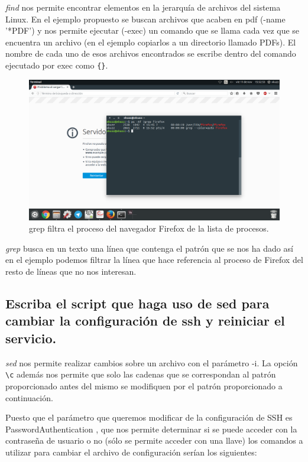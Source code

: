 \begin{flushleft}
\textit{find} nos permite encontrar elementos en la jerarquía de archivos del sistema Linux. En el ejemplo propuesto se buscan archivos que acaben en pdf (-name '*PDF') y nos permite ejecutar (-exec) un comando que se llama cada vez que se encuentra un archivo (en el ejemplo copiarlos a un directorio llamado PDFs). El nombre de cada uno de esos archivos encontrados se escribe dentro del comando ejecutado por exec como \verb|{}|. \cite{c15a}

\begin{figure}[H]
	\centering
	\includegraphics[scale=0.3]{grep.png}
	\caption{grep filtra el proceso del navegador Firefox de la lista de procesos.}
\end{figure}

\textit{grep} busca en un texto una línea que contenga el patrón que se nos ha dado así en el ejemplo podemos filtrar la línea que hace referencia al proceso de Firefox del resto de líneas que no nos interesan.\cite{c15a2}

\subsection{Escriba el script que haga uso de sed para cambiar la configuración de ssh y reiniciar el servicio.}
\textit{sed} nos permite realizar cambios sobre un archivo con el parámetro -i. La opción \verb|\c| además nos permite que solo las cadenas que se correspondan al patrón proporcionado antes del mismo se modifiquen por el patrón proporcionado a continuación. \cite{c15b}

Puesto que el parámetro que queremos modificar de la configuración de SSH es PasswordAuthentication \cite{c7b}, que nos permite determinar si se puede acceder con la contraseña de usuario o no (sólo se permite acceder con una llave) los comandos a utilizar para cambiar el archivo de configuración serían los siguientes:


\end{flushleft}
